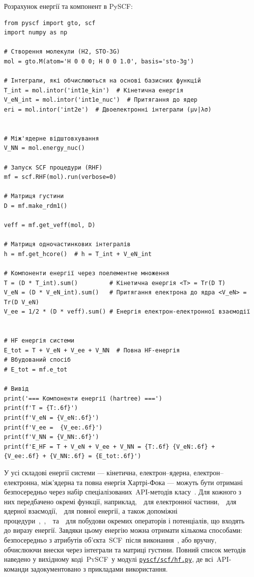 Розрахунок енергії та компонент в PySCF:
\begin{verbatim}
from pyscf import gto, scf
import numpy as np

# Створення молекули (H2, STO-3G)
mol = gto.M(atom='H 0 0 0; H 0 0 1.0', basis='sto-3g')

# Інтеграли, які обчислюються на основі базисних функцій
T_int = mol.intor('int1e_kin')  # Кінетична енергія
V_eN_int = mol.intor('int1e_nuc')  # Притягання до ядер
eri = mol.intor('int2e')  # Двоелектронні інтеграли (μν|λσ)


# Між'ядерне відштовхування
V_NN = mol.energy_nuc()

# Запуск SCF процедури (RHF)
mf = scf.RHF(mol).run(verbose=0)

# Матриця густини
D = mf.make_rdm1()

veff = mf.get_veff(mol, D)

# Матриця одночастинкових інтегралів
h = mf.get_hcore()  # h = T_int + V_eN_int

# Компоненти енергії через поелементне множення
T = (D * T_int).sum()         # Кінетична енергія <T> = Tr(D T)
V_eN = (D * V_eN_int).sum()   # Притягання електрона до ядра <V_eN> = Tr(D V_eN)
V_ee = 1/2 * (D * veff).sum() # Енергія електрон-електронної взаємодії


# HF енергія системи
E_tot = T + V_eN + V_ee + V_NN  # Повна HF-енергія
# Вбудований спосіб
# E_tot = mf.e_tot

# Вивід
print('=== Компоненти енергії (hartree) ===')
print(f'T = {T:.6f}')
print(f'V_eN = {V_eN:.6f}')
print(f'V_ee =  {V_ee:.6f}')
print(f'V_NN = {V_NN:.6f}')
print(f'E_HF = T + V_eN + V_ee + V_NN = {T:.6f} {V_eN:.6f} + {V_ee:.6f} + {V_NN:.6f} = {E_tot:.6f}')
\end{verbatim}

У \PySCF{} усі складові енергії системи --- кінетична, електрон--ядерна, електрон--електронна, між’ядерна та повна енергія Хартрі-Фока --- можуть бути отримані безпосередньо через набір спеціалізованих~API-методів класу~. Для кожного з них передбачено окремі функції, наприклад,~~для електронної частини,~~для ядерної взаємодії,~~для повної енергії, а також допоміжні процедури~,~,~~та~~для побудови окремих операторів і потенціалів, що входять до виразу енергії. Завдяки цьому енергію можна отримати кількома способами: безпосередньо з атрибутів об’єкта~SCF~після виконання~, або вручну, обчислюючи внески через інтеграли та матриці густини. Повний список методів наведено у вихідному коді~\textsc{PySCF}~у модулі \href{https://pyscf.org/_modules/pyscf/scf/hf.html}{\texttt{pyscf/scf/hf.py}}, де всі~API-команди задокументовано з прикладами використання.

